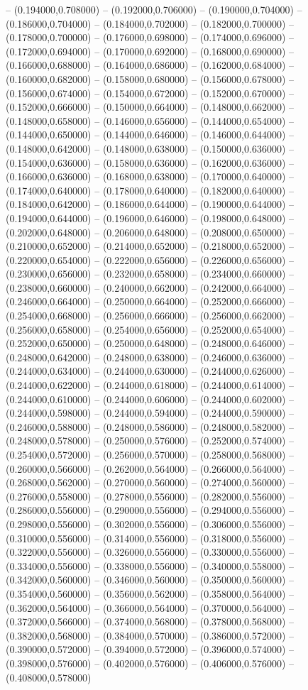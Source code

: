 -- (0.194000,0.708000) -- (0.192000,0.706000) -- (0.190000,0.704000) -- (0.186000,0.704000) -- (0.184000,0.702000) -- (0.182000,0.700000) -- (0.178000,0.700000) -- (0.176000,0.698000) -- (0.174000,0.696000) -- (0.172000,0.694000) -- (0.170000,0.692000) -- (0.168000,0.690000) -- (0.166000,0.688000) -- (0.164000,0.686000) -- (0.162000,0.684000) -- (0.160000,0.682000) -- (0.158000,0.680000) -- (0.156000,0.678000) -- (0.156000,0.674000) -- (0.154000,0.672000) -- (0.152000,0.670000) -- (0.152000,0.666000) -- (0.150000,0.664000) -- (0.148000,0.662000) -- (0.148000,0.658000) -- (0.146000,0.656000) -- (0.144000,0.654000) -- (0.144000,0.650000) -- (0.144000,0.646000) -- (0.146000,0.644000) -- (0.148000,0.642000) -- (0.148000,0.638000) -- (0.150000,0.636000) -- (0.154000,0.636000) -- (0.158000,0.636000) -- (0.162000,0.636000) -- (0.166000,0.636000) -- (0.168000,0.638000) -- (0.170000,0.640000) -- (0.174000,0.640000) -- (0.178000,0.640000) -- (0.182000,0.640000) -- (0.184000,0.642000) -- (0.186000,0.644000) -- (0.190000,0.644000) -- (0.194000,0.644000) -- (0.196000,0.646000) -- (0.198000,0.648000) -- (0.202000,0.648000) -- (0.206000,0.648000) -- (0.208000,0.650000) -- (0.210000,0.652000) -- (0.214000,0.652000) -- (0.218000,0.652000) -- (0.220000,0.654000) -- (0.222000,0.656000) -- (0.226000,0.656000) -- (0.230000,0.656000) -- (0.232000,0.658000) -- (0.234000,0.660000) -- (0.238000,0.660000) -- (0.240000,0.662000) -- (0.242000,0.664000) -- (0.246000,0.664000) -- (0.250000,0.664000) -- (0.252000,0.666000) -- (0.254000,0.668000) -- (0.256000,0.666000) -- (0.256000,0.662000) -- (0.256000,0.658000) -- (0.254000,0.656000) -- (0.252000,0.654000) -- (0.252000,0.650000) -- (0.250000,0.648000) -- (0.248000,0.646000) -- (0.248000,0.642000) -- (0.248000,0.638000) -- (0.246000,0.636000) -- (0.244000,0.634000) -- (0.244000,0.630000) -- (0.244000,0.626000) -- (0.244000,0.622000) -- (0.244000,0.618000) -- (0.244000,0.614000) -- (0.244000,0.610000) -- (0.244000,0.606000) -- (0.244000,0.602000) -- (0.244000,0.598000) -- (0.244000,0.594000) -- (0.244000,0.590000) -- (0.246000,0.588000) -- (0.248000,0.586000) -- (0.248000,0.582000) -- (0.248000,0.578000) -- (0.250000,0.576000) -- (0.252000,0.574000) -- (0.254000,0.572000) -- (0.256000,0.570000) -- (0.258000,0.568000) -- (0.260000,0.566000) -- (0.262000,0.564000) -- (0.266000,0.564000) -- (0.268000,0.562000) -- (0.270000,0.560000) -- (0.274000,0.560000) -- (0.276000,0.558000) -- (0.278000,0.556000) -- (0.282000,0.556000) -- (0.286000,0.556000) -- (0.290000,0.556000) -- (0.294000,0.556000) -- (0.298000,0.556000) -- (0.302000,0.556000) -- (0.306000,0.556000) -- (0.310000,0.556000) -- (0.314000,0.556000) -- (0.318000,0.556000) -- (0.322000,0.556000) -- (0.326000,0.556000) -- (0.330000,0.556000) -- (0.334000,0.556000) -- (0.338000,0.556000) -- (0.340000,0.558000) -- (0.342000,0.560000) -- (0.346000,0.560000) -- (0.350000,0.560000) -- (0.354000,0.560000) -- (0.356000,0.562000) -- (0.358000,0.564000) -- (0.362000,0.564000) -- (0.366000,0.564000) -- (0.370000,0.564000) -- (0.372000,0.566000) -- (0.374000,0.568000) -- (0.378000,0.568000) -- (0.382000,0.568000) -- (0.384000,0.570000) -- (0.386000,0.572000) -- (0.390000,0.572000) -- (0.394000,0.572000) -- (0.396000,0.574000) -- (0.398000,0.576000) -- (0.402000,0.576000) -- (0.406000,0.576000) -- (0.408000,0.578000) 